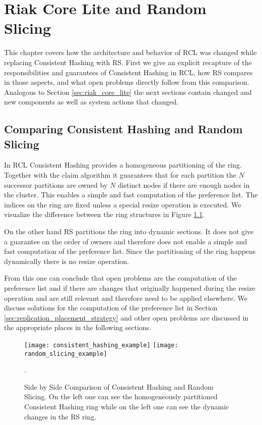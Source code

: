
\chapter{Riak Core Lite and Random Slicing}
This chapter covers how the architecture and behavior of \ac{RCL} was changed while replacing Consistent Hashing with \ac{RS}.
First we give an explicit recapture of the responsibilities and guarantees of Consistent Hashing in \ac{RCL}, how \ac{RS} compares in those aspects, and what open problems directly follow from this comparison.
Analogous to Section \ref{sec:riak_core_lite} the next sections contain changed and new components as well as system actions that changed.

\section{Comparing Consistent Hashing and Random Slicing}
In \ac{RCL} Consistent Hashing provides a homogeneous partitioning of the ring.
Together with the claim algorithm it guarantees that for each partition the $N$ successor partitions are owned by $N$ distinct nodes if there are enough nodes in the cluster.
This enables a simple and fast computation of the preference list.
The indices on the ring are fixed unless a special resize operation is executed.
We visualize the difference between the ring structures in Figure \ref{fig:chash_and_rslicing}.

On the other hand \ac{RS} partitions the ring into dynamic sections.
It does not give a guarantee on the order of owners and therefore does not enable a simple and fast computation of the preference list.
Since the partitioning of the ring happens dynamically there is no resize operation.

From this one can conclude that open problems are the computation of the preference list and if there are changes that originally happened during the resize operation and are still relevant and therefore need to be applied elsewhere.
We discuss solutions for the computation of the preference list in Section \ref{sec:replication_placement_strategy} and other open problems are discussed in the appropriate places in the following sections.

\begin{figure}
\texttt{[image: consistent\_hashing\_example]}
\texttt{[image: random\_slicing\_example]}
\caption[Side by Side Comparison of Consistent Hashing and Random Slicing]{Side by Side Comparison of Consistent Hashing and Random Slicing. On the left one can see the homogeneously partitioned Consistent Hashing ring while on the left one can see the dynamic changes in the \ac{RS} ring.}
\label{fig:chash_and_rslicing}.
\end{figure}


